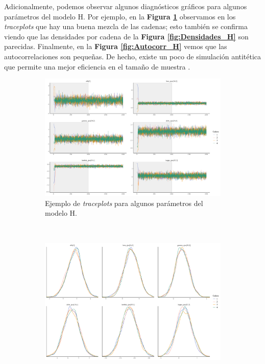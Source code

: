  Adicionalmente, podemos observar algunos diagnósticos gráficos para algunos parámetros del modelo H. Por ejemplo, en la \textbf{Figura \ref{fig:Traceplots_H}} observamos en los \textit{traceplots} que hay una buena mezcla de las cadenas; esto también se confirma viendo que las densidades por cadena de la \textbf{Figura \ref{fig:Densidades_H}} son parecidas. Finalmente, en la \textbf{Figura \ref{fig:Autocorr_H}} vemos que las autocorrelaciones son pequeñas. De hecho, existe un poco de simulación antitética que permite una mejor eficiencia en el tamaño de muestra \parencite{BlogAntithetical}.\\ 
 
 \begin{figure}[h]
	\centering
	\begin{subfigure}{0.45\textwidth}
	\includegraphics[width = \textwidth]{Figs/Convergencia/Convergencia_Traceplots}
	\caption{Ejemplo de \textit{traceplots} para algunos parámetros del modelo H.}
	\label{fig:Traceplots_H}
	\end{subfigure}
	~
	\begin{subfigure}{0.45\textwidth}
	\includegraphics[width = \textwidth]{Figs/Convergencia/Convergencia_Densidades}

\end{subfigure}
\end{figure}
